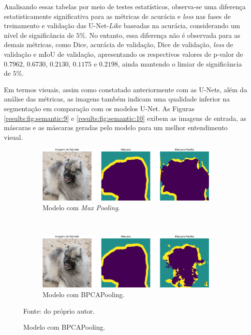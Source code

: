 Analisando essas tabelas por meio de testes estatísticos, observa-se uma diferença estatisticamente significativa para as métricas de acurácia e \textit{loss} nas fases de treinamento e validação das U-Net-\textit{Like} baseadas na acurácia, considerando um nível de significância de $5\%$. No entanto, essa diferença não é observada para as demais métricas, como Dice, acurácia de validação, Dice de validação, \textit{loss} de validação e mIoU de validação, apresentando os respectivos valores de p-valor de $0.7962$, $0.6730$, $0.2130$, $0.1175$ e $0.2198$, ainda mantendo o limiar de significância de $5\%$.

Em termos visuais, assim como constatado anteriormente com as U-Nets, além da análise das métricas, as imagens também indicam uma qualidade inferior na segmentação em comparação com os modelos U-Net. As Figuras \ref{results:fig:semantic:9} e \ref{results:fig:semantic:10} exibem as imagens de entrada, as máscaras e as máscaras geradas pelo modelo para um melhor entendimento visual.

\begin{figure}[H]
    \centering
    \caption[Aplicação de U-Net-\textit{Like} baseada em acurácia.]{Imagem de entrada, máscara e saída do modelo U-Net-\textit{Like} baseado em acurácia, respectivamente.}
    \label{results:fig:semantic:9}
    \begin{subfigure}[t]{0.9\textwidth}
        \centering
        \includegraphics[width=1\linewidth]{recursos/imagens/results/image_0_max_unetlike_500.png}
        \caption{Modelo com \textit{Max Pooling}.}
        \label{results:fig:semantic:9.1}
    \end{subfigure}%
    ~
    
    \begin{subfigure}[t]{0.9\textwidth}
        \centering
        \includegraphics[width=1\linewidth]{recursos/imagens/results/image_0_bpca_unetlike_500.png}
        \caption{Modelo com BPCAPooling.}
        \label{results:fig:semantic:9.2}
    \end{subfigure}%

    Fonte: do próprio autor.
\end{figure}

